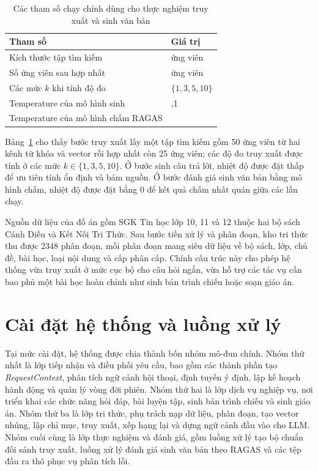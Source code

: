 \documentclass[../DoAn.tex]{subfiles}
\begin{document}
\begin{table}[H]
    \centering
    \renewcommand{\arraystretch}{1.25}
    \begin{tabular}{|p{}|>{\centering\arraybackslash}p{}|}
        \hline
        \textbf{Tham số} & \textbf{Giá trị} \\
        \hline
        Kích thước tập tìm kiếm & 50 ứng viên \\
        \hline
        Số ứng viên sau hợp nhất & 25 ứng viên \\
        \hline
        Các mức $k$ khi tính độ đo & $\{1, 3, 5, 10\}$ \\
        \hline
        Temperature của mô hình sinh & 0,1 \\
        \hline
        Temperature của mô hình chấm RAGAS & 0 \\
        \hline
    \end{tabular}
    \vspace{0.2cm}
\caption{Các tham số chạy chính dùng cho thực nghiệm truy xuất và sinh văn bản}
    \label{tab:exp-params}
\end{table}

Bảng~\ref{tab:exp-params} cho thấy bước truy xuất lấy một tập tìm kiếm gồm 50 ứng viên từ hai kênh từ khóa và vector rồi hợp nhất còn 25 ứng viên; các độ đo truy xuất được tính ở các mức $k \in \{1,3,5,10\}$. Ở bước sinh câu trả lời, nhiệt độ được đặt thấp để ưu tiên tính ổn định và bám nguồn. Ở bước đánh giá sinh văn bản bằng mô hình chấm, nhiệt độ được đặt bằng 0 để kết quả chấm nhất quán giữa các lần chạy.

Nguồn dữ liệu của đồ án gồm SGK Tin học lớp 10, 11 và 12 thuộc hai bộ sách Cánh Diều và Kết Nối Tri Thức. Sau bước tiền xử lý và phân đoạn, kho tri thức thu được 2348 phân đoạn, mỗi phân đoạn mang siêu dữ liệu về bộ sách, lớp, chủ đề, bài học, loại nội dung và cấp phân cấp. Chính cấu trúc này cho phép hệ thống vừa truy xuất ở mức cục bộ cho câu hỏi ngắn, vừa hỗ trợ các tác vụ cần bao phủ một bài học hoàn chỉnh như sinh bản trình chiếu hoặc soạn giáo án.

\section{Cài đặt hệ thống và luồng xử lý}

Tại mức cài đặt, hệ thống được chia thành bốn nhóm mô-đun chính. Nhóm thứ nhất là lớp tiếp nhận và điều phối yêu cầu, bao gồm các thành phần tạo \textit{RequestContext}, phân tích ngữ cảnh hội thoại, định tuyến ý định, lập kế hoạch hành động và quản lý vòng đời phiên. Nhóm thứ hai là lớp dịch vụ nghiệp vụ, nơi triển khai các chức năng hỏi đáp, bài luyện tập, sinh bản trình chiếu và sinh giáo án. Nhóm thứ ba là lớp tri thức, phụ trách nạp dữ liệu, phân đoạn, tạo vector nhúng, lập chỉ mục, truy xuất, xếp hạng lại và dựng ngữ cảnh đầu vào cho LLM. Nhóm cuối cùng là lớp thực nghiệm và đánh giá, gồm luồng xử lý tạo bộ chuẩn đối sánh truy xuất, luồng xử lý đánh giá sinh văn bản theo RAGAS và các tệp đầu ra thô phục vụ phân tích lỗi.
\end{document}
